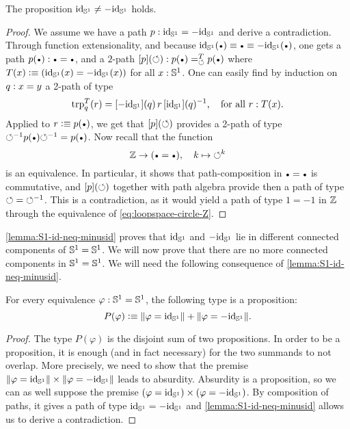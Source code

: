 \documentclass[english,a4paper]{lmcs}
\begin{document}
\begin{lem}
  \label{lemma:S1-id-neq-minusid}%
  The proposition $\id_\Sc \neq -\id_\Sc$ holds.
\end{lem}
\begin{proof}
  We assume we have a path $p\from\id_\Sc = -\id_\Sc$ and derive a
  contradiction. Through function extensionality, and because
  $\id_\Sc(\base) \jdeq \base \jdeq -\id_\Sc(\base)$, one gets a path
  $p(\base) \from \base = \base$, and a $2$-path
  $\ap p (\Sloop) \from \pathover {p(\base)} T \Sloop {p(\base)}$ where
  $T(x)\defequi (\id_\Sc(x) = -\id_\Sc(x))$ for all $x:\Sc$. One can
  easily find by induction on $q\from x=y$ a 2-path of type
  \begin{displaymath}
    \trp [T] q (r) = \ap{-\id_\Sc}(q)\, r \inv{\ap{\id_\Sc}(q)},
    \quad\text{for all $r : T(x)$.}
  \end{displaymath}
  Applied to $r \defequi p(\base)$, we get that $\ap p(\Sloop)$ provides a 2-path of type
  $\inv\Sloop p(\base) \inv\Sloop = p(\base)$. Now recall that
  the function
  \begin{equation}
    \label{eq:loopspace-circle-Z}%
    \ZZ\to(\base=\base),\quad k \mapsto \Sloop^k
  \end{equation}
  is an equivalence. In particular, it shows that path-composition in
  $\base=\base$ is commutative, and $\ap p (\Sloop)$ together with
  path algebra provide then a path of type $\Sloop = \inv\Sloop$. This
  is a contradiction, as it would yield a path of type $1=-1$ in $\ZZ$
  through the equivalence of \cref{eq:loopspace-circle-Z}.
\end{proof}
\cref{lemma:S1-id-neq-minusid} proves that $\id_\Sc$ and $-\id_\Sc$
lie in different connected components of $\Sc=\Sc$. We will now prove
that there are no more connected components in $\Sc=\Sc$. We will need
the following consequence of \cref{lemma:S1-id-neq-minusid}.
\begin{cor}%
  \label{cor:S1-eq-either-isaprop}%
  For every equivalence $\varphi\from \Sc=\Sc$, the following type is
  a proposition:
  \begin{equation}
    \label{eq:S1-def-target-eq}%
    P(\varphi) \defequi \Trunc{\varphi = \id_\Sc} + \Trunc{\varphi = -\id_\Sc}.
  \end{equation}
\end{cor}
\begin{proof}
  The type $P(\varphi)$ is the disjoint sum of two propositions. In
  order to be a proposition, it is enough (and in fact necessary) for
  the two summands to not overlap. More precisely, we need to show
  that the premise
  $\Trunc{\varphi = \id_\Sc}\times\Trunc{\varphi = -\id_\Sc}$ leads to
  absurdity. Absurdity is a proposition, so we can as well suppose the
  premise ${(\varphi = \id_\Sc)}\times{(\varphi = -\id_\Sc)}$. By
  composition of paths, it gives a path of type $\id_\Sc = -\id_\Sc$
  and \cref{lemma:S1-id-neq-minusid} allows us to derive a
  contradiction.
\end{proof}
\end{document}
